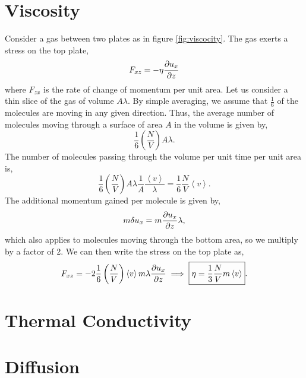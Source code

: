 \documentclass{book}
\begin{document}
\section{Viscosity}
Consider a gas between two plates as in figure \ref{fig:viscocity}. The gas exerts a stress on the top plate,
\begin{equation}
	F_{xz} = -\eta \pdv{u_x}{z}
\end{equation}
where $F_{zx}$ is the rate of change of momentum per unit area. Let us consider a thin slice of the gas of volume $A \lambda$. By simple averaging, we assume that $\frac{1}{6}$ of the molecules are moving in any given direction. Thus, the average number of molecules moving through a surface of area $A$ in the volume is given by,
\begin{equation}
	\frac{1}{6}\left(\frac{N}{V}\right)A\lambda.
\end{equation} 
The number of molecules passing through the volume per unit time per unit area is,
\begin{equation}
	\frac{1}{6}\left(\frac{N}{V}\right)A\lambda\frac{1}{A}\frac{\left<v\right>}{\lambda}=\frac{1}{6}\frac{N}{V}\left<v\right>.
\end{equation}
The additional momentum gained per molecule is given by,
\begin{equation}
	m\delta u_x = m\pdv{u_x}{z}\lambda,
\end{equation}
which also applies to molecules moving through the bottom area, so we multiply by a factor of 2. We can then write the stress on the top plate as,
\begin{equation}
	F_{xz} = -2\frac{1}{6}\left(\frac{N}{V}\right)\left<v\right>m\lambda\pdv{u_x}{z} \implies \boxed{\eta = \frac{1}{3}\frac{N}{V}m\left<v\right>}.
\end{equation}
\section{Thermal Conductivity}
\section{Diffusion}
\appendix
\end{document}
